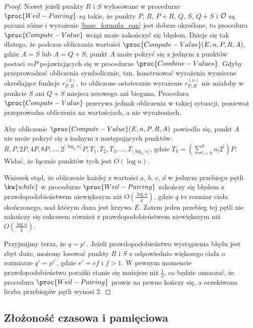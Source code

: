 \begin{proof}
Nawet jeżeli punkty $R$ i $S$ wylosowane w procedurze $\proc{Weil-Pairing}$
są takie, że punkty $P$, $R$, $P+R$, $Q$, $S$, $Q+S$ i $\mathcal{O}$
są parami różne
i wyrażenie \ref{base_formula_eqn} jest dobrze określone,
to procedura $\proc{Compute-Value}$ wciąż może zakończyć się błędem.
Dzieje się tak dlatego,
że podczas obliczania wartości $\proc{Compute-Value}(E, n, P, R, A)$,
gdzie $A = S$ lub $A = Q+S$,
punkt $A$ może pokryć się z jednym z punktów postaci $mP$
pojawiających się w procedurze $\proc{Combine-Values}$.
Gdyby przeprowadzać obliczenia symbolicznie,
tzn. konstruować wyrażenia wymierne określające funkcje $r_{P,R}^{(k)}$,
to obliczone ostatecznie wyrażenie $r_{P,R}^{(n)}$
nie miałoby w punkcie $S$ ani $Q+S$ miejsca zerowego ani bieguna.
Procedura $\proc{Compute-Value}$ przerywa jednak obliczenia w takiej sytuacji,
ponieważ przeprowadza obliczenia na wartościach, a nie wyrażeniach.

\noindent
Aby obliczenie $\proc{Compute-Value}(E, n, P, R, A)$ powiodło się,
punkt $A$ nie może pokryć się z żadnym z następujących punktów:
$R, P, 2P, 4P, 8P, \ldots, 2^{\lfloor\log_2 n\rfloor}P,
T_1, T_2, T_3, \ldots, T_{\lfloor\log_2 n\rfloor}$,
gdzie $T_k = \left(\sum_{l=0}^k n_l2^l\right)P$.
Widać, że łącznie punktów tych jest $O(\log n)$.

\noindent
Wniosek stąd, że obliczenie każdej z wartości $a$, $b$, $c$, $d$
w jednym przebiegu pętli $\kw{while}$ w procedurze $\proc{Weil-Pairing}$
zakończy się błędem
z prawdopodobieństwem niewiększym niż $O(\frac{\log n}{q})$,
gdzie $q$ to rozmiar ciała skończonego, nad którym dana jest krzywa $E$.
Zatem jeden przebieg tej pętli nie zakończy się sukcesem
również z prawdopodobieństwem niewiększym niż $O(\frac{\log n}{q})$.

\noindent
Przyjmijmy teraz, że $q = p^e$.
Jeżeli prawdopodobieństwo wystąpienia błędu jest zbyt duże,
możemy losować punkty $R$ i $S$ z odpowiednio większego ciała
o rozmiarze $q' = p^{e'}$, gdzie $e' = ef$ i $f > 1$.
W pewnym momencie prawdopodobieństwo porażki
stanie się mniejsze niż $\frac{1}{2}$,
co będzie oznaczać,
że procedura $\proc{Weil-Pairing}$ prawie na pewno kończy się,
a oczekiwana liczba przebiegów pętli wynosi $2$.
\end{proof}

\subsection*{Złożoność czasowa i pamięciowa}

